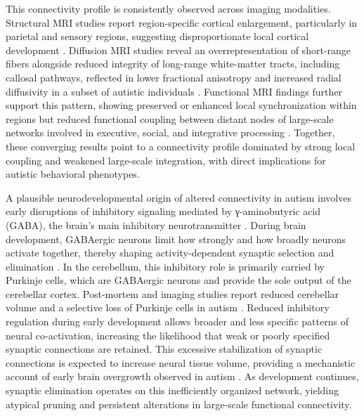 \documentclass{article}
\begin{document}
This connectivity profile is consistently observed across imaging modalities. Structural MRI studies report region-specific cortical enlargement, particularly in parietal and sensory regions, suggesting disproportionate local cortical development \citep{Piven1997,Courchesne2001}. Diffusion MRI studies reveal an overrepresentation of short-range fibers alongside reduced integrity of long-range white-matter tracts, including callosal pathways, reflected in lower fractional anisotropy and increased radial diffusivity in a subset of autistic individuals \citep{Alexander2007,Shukla2010,Casanova2002}. Functional MRI findings further support this pattern, showing preserved or enhanced local synchronization within regions but reduced functional coupling between distant nodes of large-scale networks involved in executive, social, and integrative processing \citep{Just2007,Mason2008}. Together, these converging results point to a connectivity profile dominated by strong local coupling and weakened large-scale integration, with direct implications for autistic behavioral phenotypes.

A plausible neurodevelopmental origin of altered connectivity in autism involves early disruptions of inhibitory signaling mediated by γ-aminobutyric acid (GABA), the brain’s main inhibitory neurotransmitter \citep{Rubenstein2003,Belmonte2004}. During brain development, GABAergic neurons limit how strongly and how broadly neurons activate together, thereby shaping activity-dependent synaptic selection and elimination \citep{Hensch2004,BenAri2002}. In the cerebellum, this inhibitory role is primarily carried by Purkinje cells, which are GABAergic neurons and provide the sole output of the cerebellar cortex. Post-mortem and imaging studies report reduced cerebellar volume and a selective loss of Purkinje cells in autism \citep{Courchesne1994,Fatemi2012}. Reduced inhibitory regulation during early development allows broader and less specific patterns of neural co-activation, increasing the likelihood that weak or poorly specified synaptic connections are retained. This excessive stabilization of synaptic connections is expected to increase neural tissue volume, providing a mechanistic account of early brain overgrowth observed in autism \citep{Courchesne2001,Hazlett2005}. As development continues, synaptic elimination operates on this inefficiently organized network, yielding atypical pruning and persistent alterations in large-scale functional connectivity.
\end{document}
